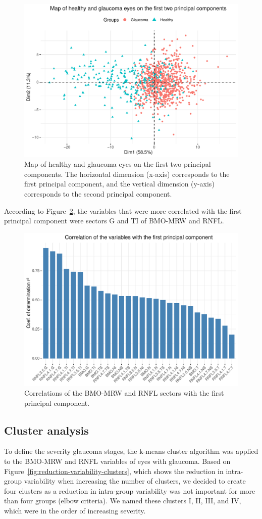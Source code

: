 \documentclass[jcm,article,submit,moreauthors,pdftex]{Definitions/mdpi}
\begin{document}
\begin{figure}[ht]
\centering
\includegraphics[width=0.5\linewidth]{img/pca-map.pdf}
\caption{Map of healthy and glaucoma eyes on the first two principal components. The horizontal dimension (x-axis) corresponds to the first principal component, and the vertical dimension (y-axis) corresponds to the second principal component.}
\label{fig:pca-map}
\end{figure}

According to Figure~\ref{fig:correlation-pca}, the variables that were more correlated with the first principal component were sectors G and TI of BMO-MRW and RNFL.

\begin{figure}[ht]
\centering
\includegraphics[width=0.5\linewidth]{img/correlation-pca.pdf}
\caption{Correlations of the BMO-MRW and RNFL sectors with the first principal component.}
\label{fig:correlation-pca}
\end{figure}

\subsection{Cluster analysis}

To define the severity glaucoma stages, the k-means cluster algorithm was applied to the BMO-MRW and RNFL variables of eyes with glaucoma.  Based on Figure~\ref{fig:reduction-variability-clusters}, which shows the reduction in intra-group variability when increasing the number of clusters, we decided to create four clusters as a reduction in intra-group variability was not important for more than four groups (elbow criteria). We named these clusters I, II, III, and IV, which were in the order of increasing severity.
\end{document}
